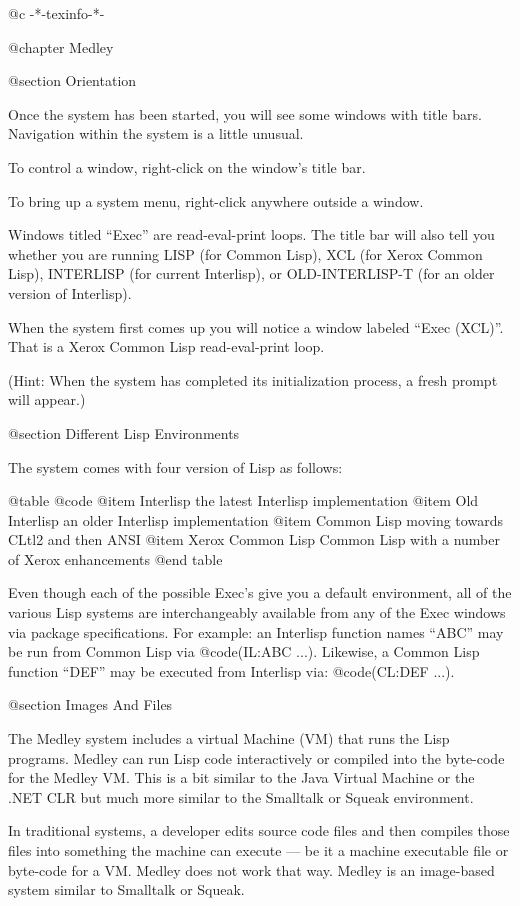 @c -*-texinfo-*-

@chapter Medley

@section Orientation

Once the system has been started, you will see some windows with title bars.
Navigation within the system is a little unusual.

To control a window, right-click on the window's title bar.

To bring up a system menu, right-click anywhere outside a window.

Windows titled ``Exec'' are read-eval-print loops.  The title bar will
also tell you whether you are running LISP (for Common Lisp), XCL (for
Xerox Common Lisp), INTERLISP (for current Interlisp), or
OLD-INTERLISP-T (for an older version of Interlisp).

When the system first comes up you will notice a window labeled ``Exec (XCL)''.
That is a Xerox Common Lisp read-eval-print loop.

(Hint: When the system has completed its initialization process, a
fresh prompt will appear.)

@section Different Lisp Environments

The system comes with four version of Lisp as follows:

@table @code
@item Interlisp
the latest Interlisp implementation
@item Old Interlisp
an older Interlisp implementation
@item Common Lisp
moving towards CLtl2 and then ANSI
@item Xerox Common Lisp
Common Lisp with a number of Xerox enhancements
@end table

Even though each of the possible Exec's give you a default environment,
all of the various Lisp systems are interchangeably available from any of the
Exec windows via package specifications.  For example: an Interlisp function
names ``ABC'' may be run from Common Lisp via @code{(IL:ABC ...)}.  Likewise,
a Common Lisp function ``DEF'' may be executed from Interlisp via: 
@code{(CL:DEF ...)}.

@section Images And Files

The Medley system includes a virtual Machine (VM) that runs the Lisp programs.
Medley can run Lisp code interactively or compiled into the byte-code for the
Medley VM.  This is a bit similar to the Java Virtual Machine or the .NET CLR but
much more similar to the Smalltalk or Squeak environment.

In traditional systems, a developer edits source code files and then
compiles those files into something the machine can execute --- be it
a machine executable file or byte-code for a VM.  Medley does not work
that way.  Medley is an image-based system similar to Smalltalk or Squeak.

